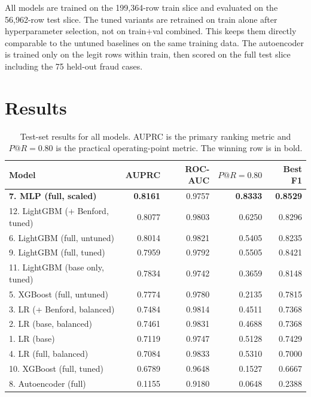 \documentclass{article}
\begin{document}
All models are trained on the 199{,}364-row train slice and evaluated on the 56{,}962-row test slice. The tuned variants are retrained on train alone after hyperparameter selection, not on train+val combined. This keeps them directly comparable to the untuned baselines on the same training data. The autoencoder is trained only on the legit rows within train, then scored on the full test slice including the 75 held-out fraud cases.

\section{Results}
\label{sec:results}

\begin{table}[h]
\centering
\small
\caption{Test-set results for all models. AUPRC is the primary ranking metric and $P@R{=}0.80$ is the practical operating-point metric. The winning row is in bold.}
\label{tab:results}
\begin{tabular}{lrrrr}
\toprule
Model & AUPRC & ROC-AUC & $P@R{=}0.80$ & Best F1 \\
\midrule
\textbf{7. MLP (full, scaled)}        & \textbf{0.8161} & 0.9757 & \textbf{0.8333} & \textbf{0.8529} \\
12. LightGBM (+ Benford, tuned)       & 0.8077 & 0.9803 & 0.6250 & 0.8296 \\
6. LightGBM (full, untuned)           & 0.8014 & 0.9821 & 0.5405 & 0.8235 \\
9. LightGBM (full, tuned)             & 0.7959 & 0.9792 & 0.5505 & 0.8421 \\
11. LightGBM (base only, tuned)       & 0.7834 & 0.9742 & 0.3659 & 0.8148 \\
5. XGBoost (full, untuned)            & 0.7774 & 0.9780 & 0.2135 & 0.7815 \\
3. LR (+ Benford, balanced)           & 0.7484 & 0.9814 & 0.4511 & 0.7368 \\
2. LR (base, balanced)                & 0.7461 & 0.9831 & 0.4688 & 0.7368 \\
1. LR (base)                          & 0.7119 & 0.9747 & 0.5128 & 0.7429 \\
4. LR (full, balanced)                & 0.7084 & 0.9833 & 0.5310 & 0.7000 \\
10. XGBoost (full, tuned)             & 0.6789 & 0.9648 & 0.1527 & 0.6667 \\
8. Autoencoder (full)                 & 0.1155 & 0.9180 & 0.0648 & 0.2388 \\
\bottomrule
\end{tabular}
\end{table}
\end{document}
